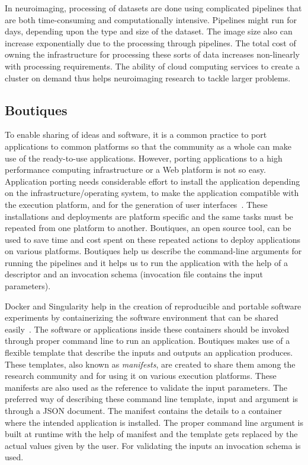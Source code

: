 In neuroimaging, processing of datasets are done using complicated pipelines that are both time-consuming and computationally intensive. Pipelines might run for days, depending upon the type and size of the dataset. The image size also can increase exponentially due to the processing through pipelines. The total cost of owning the infrastructure for processing these sorts of data increases non-linearly with processing requirements. The ability of cloud computing services to create a cluster on demand thus helps neuroimaging research to tackle larger problems.

\subsection{Boutiques}
To enable sharing of ideas and software, it is a common practice to port applications to common platforms so that the community as a whole can make use of the ready-to-use applications. However, porting applications to a high performance computing infrastructure or a Web platform is not so easy. Application porting needs considerable effort to install the application depending on the infrastructure/operating system, to make the application compatible with the execution platform, and for the generation of user interfaces~\cite{boutiques}. These installations and deployments are platform specific and the same tasks must be repeated from one platform to another. Boutiques, an open source tool, can be used to save time and cost spent on these repeated actions to deploy applications on various platforms. Boutiques help us describe the command-line arguments for running the pipelines and it  helps us to run the application with the help of a descriptor and 
an invocation schema (invocation file contains the input parameters).

Docker and Singularity help in the creation of reproducible and portable software experiments by containerizing the software environment that can be shared easily~\cite{boutiques}. The software or applications inside these containers should be invoked through proper command line to run an application. Boutiques makes use of a flexible template that describe the inputs and outputs an application produces. These templates, also known as \textit{manifests}, are created to share them among the research community and for using it on various execution platforms. These manifests are also used as the reference to validate the input parameters. The preferred way of describing these command line template, input and argument is through a JSON document. The manifest contains the details to a container where the intended application is installed. The proper command line argument is built at runtime with the help of manifest and the template gets replaced by the actual values given by the user. For validating the inputs an invocation schema is used.


